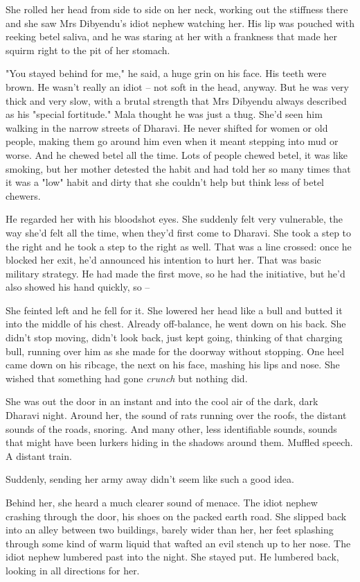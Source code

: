 She rolled her head from side to side on her neck, working out the
stiffness there and she saw Mrs Dibyendu's idiot nephew watching
her. His lip was pouched with reeking betel saliva, and he was
staring at her with a frankness that made her squirm right to the
pit of her stomach.

"You stayed behind for me," he said, a huge grin on his face. His
teeth were brown. He wasn't really an idiot -- not soft in the
head, anyway. But he was very thick and very slow, with a brutal
strength that Mrs Dibyendu always described as his "special
fortitude." Mala thought he was just a thug. She'd seen him walking
in the narrow streets of Dharavi. He never shifted for women or old
people, making them go around him even when it meant stepping into
mud or worse. And he chewed betel all the time. Lots of people
chewed betel, it was like smoking, but her mother detested the
habit and had told her so many times that it was a "low" habit and
dirty that she couldn't help but think less of betel chewers.

He regarded her with his bloodshot eyes. She suddenly felt very
vulnerable, the way she'd felt all the time, when they'd first come
to Dharavi. She took a step to the right and he took a step to the
right as well. That was a line crossed: once he blocked her exit,
he'd announced his intention to hurt her. That was basic military
strategy. He had made the first move, so he had the initiative, but
he'd also showed his hand quickly, so --

She feinted left and he fell for it. She lowered her head like a
bull and butted it into the middle of his chest. Already
off-balance, he went down on his back. She didn't stop moving,
didn't look back, just kept going, thinking of that charging bull,
running over him as she made for the doorway without stopping. One
heel came down on his ribcage, the next on his face, mashing his
lips and nose. She wished that something had gone \emph{crunch} but
nothing did.

She was out the door in an instant and into the cool air of the
dark, dark Dharavi night. Around her, the sound of rats running
over the roofs, the distant sounds of the roads, snoring. And many
other, less identifiable sounds, sounds that might have been
lurkers hiding in the shadows around them. Muffled speech. A
distant train.

Suddenly, sending her army away didn't seem like such a good idea.

Behind her, she heard a much clearer sound of menace. The idiot
nephew crashing through the door, his shoes on the packed earth
road. She slipped back into an alley between two buildings, barely
wider than her, her feet splashing through some kind of warm liquid
that wafted an evil stench up to her nose. The idiot nephew
lumbered past into the night. She stayed put. He lumbered back,
looking in all directions for her.

